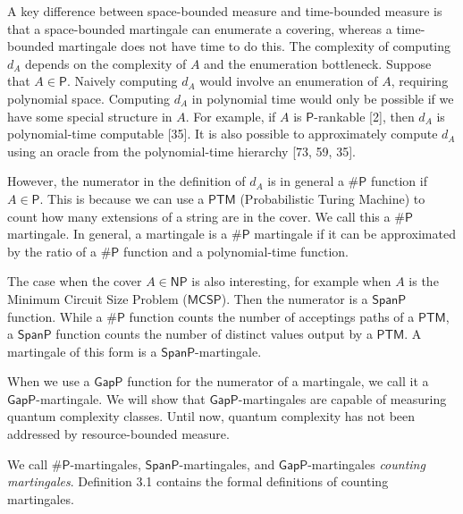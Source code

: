 A key difference between space-bounded measure and time-bounded
measure is that a space-bounded martingale can enumerate a covering,
whereas a time-bounded martingale does not have time to do this.
The complexity of computing $d_{A}$ depends on the complexity of $A$ and the enumeration bottleneck.
Suppose that $A\in\mathsf{P}$.
Naively computing $d_{A}$ would involve an
enumeration of $A$, requiring polynomial space.
Computing $d_{A}$ in polynomial time would only be possible if we have some special
structure in $A$. For example, if $A$ is $\mathsf{P}$-rankable [2], then $d_{A}$ is
polynomial-time computable [35]. It is also possible
to approximately compute $d_{A}$ using an oracle from the
polynomial-time hierarchy [73, 59, 35].\par




However, the numerator in the definition of $d_{A}$ is in general a ${\mathsf{\#}\mathsf{P}}$
function if $A\in\mathsf{P}$. This is because we can use a $\mathsf{PTM}$ (Probabilistic Turing Machine) to count how many extensions of a string are in the cover. We call this a ${\mathsf{\#}\mathsf{P}}$ martingale. In general, a martingale is a ${\mathsf{\#}\mathsf{P}}$ martingale if it can be approximated by the
ratio of a ${\mathsf{\#}\mathsf{P}}$ function and a polynomial-time function.\par




The case when the cover $A\in\mathsf{NP}$ is also interesting, for example when $A$ is the Minimum Circuit Size Problem ($\mathsf{MCSP}$). Then the numerator is a $\mathsf{SpanP}$ function. While a ${\mathsf{\#}\mathsf{P}}$ function counts the number of acceptings paths of a $\mathsf{PTM}$, a $\mathsf{SpanP}$ function counts the number of distinct values output by a $\mathsf{PTM}$. A martingale of this form is a $\mathsf{SpanP}$-martingale.\par




When we use a $\mathsf{GapP}$ function for the numerator of a martingale, we call it a $\mathsf{GapP}$-martingale. We will show that $\mathsf{GapP}$-martingales are capable of measuring quantum complexity classes. Until now, quantum complexity has not been addressed by resource-bounded measure.\par




We call ${\mathsf{\#}\mathsf{P}}$-martingales, $\mathsf{SpanP}$-martingales, and $\mathsf{GapP}$-martingales \emph{counting martingales}.
Definition 3.1 contains the formal definitions of counting martingales.\par





